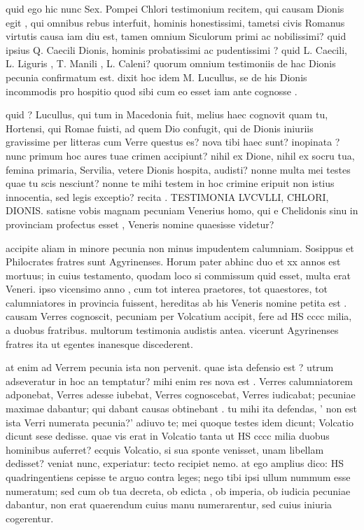  quid ego hic nunc Sex. Pompei Chlori testimonium recitem, qui causam Dionis egit , qui omnibus rebus interfuit, hominis honestissimi, tametsi civis Romanus virtutis causa iam diu est, tamen omnium Siculorum primi ac nobilissimi? quid ipsius Q. Caecili Dionis, hominis probatissimi ac pudentissimi ? quid L. Caecili, L. Liguris , T. Manili , L. Caleni? quorum omnium testimoniis de hac Dionis pecunia confirmatum est. dixit hoc idem M. Lucullus, se de his Dionis incommodis pro hospitio quod sibi cum eo esset iam ante cognosse .

 quid ? Lucullus, qui tum in Macedonia fuit, melius haec cognovit quam tu, Hortensi, qui Romae fuisti, ad quem Dio confugit, qui de Dionis iniuriis gravissime per litteras cum Verre questus es? nova tibi haec sunt? inopinata ? nunc primum hoc aures tuae crimen accipiunt? nihil ex Dione, nihil ex socru tua, femina primaria, Servilia, vetere Dionis hospita, audisti? nonne multa mei testes quae tu scis nesciunt? nonne te mihi testem in hoc crimine eripuit non istius innocentia, sed legis exceptio? recita . TESTIMONIA LVCVLLI, CHLORI, DIONIS. satisne vobis magnam pecuniam Venerius homo, qui e Chelidonis sinu in provinciam profectus esset , Veneris nomine quaesisse videtur?

 accipite aliam in minore pecunia non minus impudentem calumniam. Sosippus et Philocrates fratres sunt Agyrinenses. Horum pater abhinc duo et xx annos est mortuus; in cuius testamento, quodam loco si commissum quid esset, multa erat Veneri. ipso vicensimo anno , cum tot interea praetores, tot quaestores, tot calumniatores in provincia fuissent, hereditas ab his Veneris nomine petita est . causam Verres cognoscit, pecuniam per Volcatium accipit, fere ad HS cccc milia, a duobus fratribus. multorum testimonia audistis antea. vicerunt Agyrinenses fratres ita ut egentes inanesque discederent.

 at enim ad Verrem pecunia ista non pervenit. quae ista defensio est ? utrum adseveratur in hoc an temptatur? mihi enim res nova est . Verres calumniatorem adponebat, Verres adesse iubebat, Verres cognoscebat, Verres iudicabat; pecuniae maximae dabantur; qui dabant causas obtinebant . tu mihi ita defendas, ' non est ista Verri numerata pecunia?' adiuvo te; mei quoque testes idem dicunt; Volcatio dicunt sese dedisse. quae vis erat in Volcatio tanta ut HS cccc milia duobus hominibus auferret? ecquis Volcatio, si sua sponte venisset, unam libellam dedisset? veniat nunc, experiatur: tecto recipiet nemo. at ego amplius dico: HS quadringentiens cepisse te arguo contra leges; nego tibi ipsi ullum nummum esse numeratum; sed cum ob tua decreta, ob edicta , ob imperia, ob iudicia pecuniae dabantur, non erat quaerendum cuius manu numerarentur, sed cuius iniuria cogerentur.

